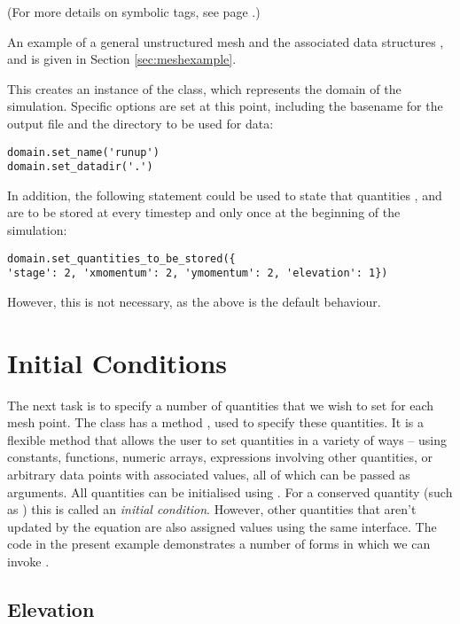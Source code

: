 \documentclass{manual}
\begin{document}
(For more details on symbolic tags, see page
\pageref{ref:tagdescription}.)

An example of a general unstructured mesh and the associated data
structures ,  and  is
given in Section \ref{sec:meshexample}.



This creates an instance of the  class, which
represents the domain of the simulation. Specific options are set at
this point, including the basename for the output file and the
directory to be used for data:

\begin{verbatim}
domain.set_name('runup')
domain.set_datadir('.')
\end{verbatim}

In addition, the following statement could be used to state that
quantities ,  and  are
to be stored at every timestep and  only once at
the beginning of the simulation:

\begin{verbatim}
domain.set_quantities_to_be_stored({
'stage': 2, 'xmomentum': 2, 'ymomentum': 2, 'elevation': 1})
\end{verbatim}

However, this is not necessary, as the above is the default behaviour.

\section{Initial Conditions}

The next task is to specify a number of quantities that we wish to
set for each mesh point. The class  has a method
, used to specify these quantities. It is a
flexible method that allows the user to set quantities in a variety
of ways -- using constants, functions, numeric arrays, expressions
involving other quantities, or arbitrary data points with associated
values, all of which can be passed as arguments. All quantities can
be initialised using . For a conserved
quantity (such as ) this is called
an \emph{initial condition}. However, other quantities that aren't
updated by the equation are also assigned values using the same
interface. The code in the present example demonstrates a number of
forms in which we can invoke .

\subsection{Elevation}
\end{document}
